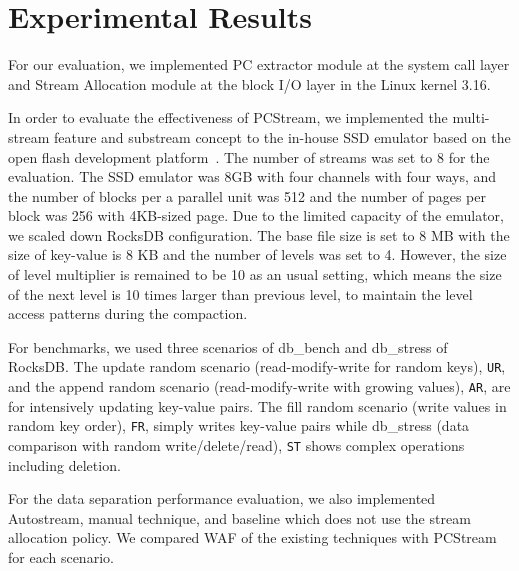 \section{Experimental Results}
For our evaluation, we implemented PC extractor module at the 
system call layer 
and Stream Allocation module at the block I/O layer in the Linux kernel 3.16.

In order to evaluate the effectiveness of PCStream,
we implemented the multi-stream feature and substream concept
to the in-house SSD emulator
based on the open flash development platform~\cite{AMF}.
The number of streams was set to 8 for the evaluation.
The SSD emulator was 8GB with four channels with four ways, and 
the number of blocks per a parallel unit was 512 and
the number of pages per block was 256 with 4KB-sized page.
Due to the limited capacity of the emulator, 
we scaled down RocksDB configuration.
The base file size is set to 8 MB
with the size of key-value is 8 KB and the number of levels was set to 4.
However, the size of level multiplier is remained to be 10 as an usual setting,
which means the size of the next level is 10 times larger than previous level,
to maintain the level access patterns during the compaction.

For benchmarks, we used three scenarios of db\_bench and db\_stress of RocksDB.
The update random scenario (read-modify-write for random keys), {\tt UR}, and 
the append random scenario (read-modify-write with growing values), {\tt AR}, are
for intensively updating key-value pairs.
The fill random scenario (write values in random key order), {\tt FR}, simply writes key-value pairs
while db\_stress (data comparison with random write/delete/read), {\tt ST} shows complex 
operations including deletion.

For the data separation performance evaluation, 
we also implemented Autostream, manual technique, and
baseline which does not use the stream allocation policy.
We compared WAF of the existing techniques with PCStream
for each scenario.




